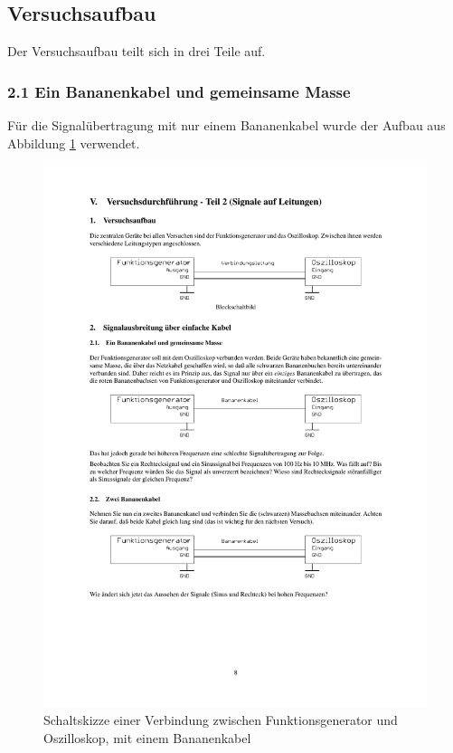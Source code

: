 \documentclass[12pt,a4paper]{article}
\begin{document}
\subsection{Versuchsaufbau}

Der Versuchsaufbau teilt sich in drei Teile auf.

\subsubsection{2.1 Ein Bananenkabel und gemeinsame Masse}

Für die Signalübertragung mit nur einem Bananenkabel wurde der Aufbau aus Abbildung \ref{fig:2.1} verwendet.

\begin{figure}[H] 
  \centering
    \includegraphics[trim = 10mm 142mm 10mm 125mm, clip, scale = 1]{2_0-2_2.pdf}
  	\caption[Schaltskizze einer Verbindung zwischen Funktionsgenerator und Oszilloskop, mit einem Bananenkabel]{Schaltskizze einer Verbindung zwischen Funktionsgenerator und Oszilloskop, mit einem Bananenkabel\footnotemark}
  \label{fig:2.1}
\end{figure}
\end{document}
